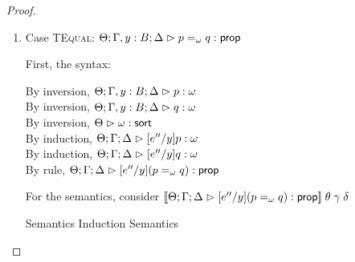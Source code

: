 \begin{proof}
\begin{enumerate}
  For semantics, consider
  $\interp{\judgeA[\Theta; \Gamma; \Delta]
                  {[e''/y](Q \beta:\kappa'.\;p)}{\assert}}\;\theta\;\gamma\;\delta$ 
  \begin{eqnproof}
          {Semantics}
          {Induction}
          {Semantics}
  \end{eqnproof}
  In this case we silently use the fact that $\beta$ does not occur free in $e''$ or $B$.

\item Case \textsc{TEqual}: $\judgeA[\Theta; \Gamma, y:B; \Delta]{p =_\omega q}{\assert}$
  
  First, the syntax:
  \begin{tabbedproof}
    \oo By inversion, $\judgeA[\Theta; \Gamma, y:B; \Delta]{p}{\omega}$ \\
    \oo By inversion, $\judgeA[\Theta; \Gamma, y:B; \Delta]{q}{\omega}$ \\
    \oo By inversion, $\judgeSort[\Theta]{\omega}$ \\
    \oo By induction, $\judgeA[\Theta; \Gamma; \Delta]{[e''/y]p}{\omega}$ \\
    \oo By induction, $\judgeA[\Theta; \Gamma; \Delta]{[e''/y]q}{\omega}$ \\
    \oo By rule, $\judgeA[\Theta; \Gamma; \Delta]{[e''/y](p =_\omega q)}{\assert}$
  \end{tabbedproof}

  For the semantics, consider $\interp{\judgeA[\Theta; \Gamma; \Delta]{[e''/y](p =_\omega q)}{\assert}}\;\theta\;\gamma\;\delta$
  \begin{eqnproof}
          {Semantics}
          {Induction}
          {Semantics}
  \end{eqnproof}


\end{enumerate}
\end{proof}
